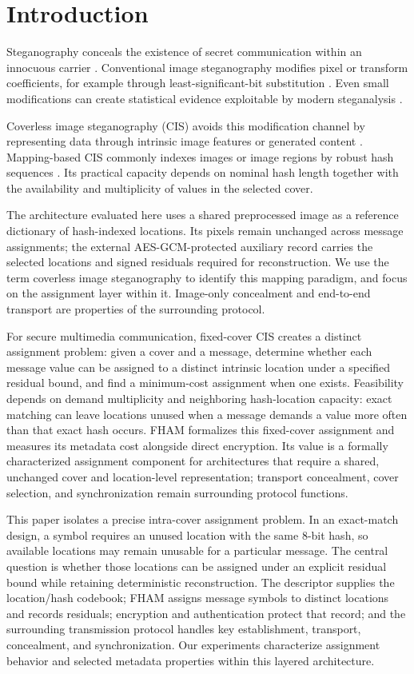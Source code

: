 \documentclass[preprint,12pt]{elsarticle}
\theoremstyle{plain}
\begin{document}
\section{Introduction}
Steganography conceals the existence of secret communication within an innocuous carrier \cite{johnson1998exploring}. Conventional image steganography modifies pixel or transform coefficients, for example through least-significant-bit substitution \cite{chan2004hiding}. Even small modifications can create statistical evidence exploitable by modern steganalysis \cite{fridrich2012rich,xu2016structural}.

Coverless image steganography (CIS) avoids this modification channel by representing data through intrinsic image features or generated content \cite{zhou2015coverless,qin2020gan,tan2024review}. Mapping-based CIS commonly indexes images or image regions by robust hash sequences \cite{zheng2018coverless}. Its practical capacity depends on nominal hash length together with the availability and multiplicity of values in the selected cover.

The architecture evaluated here uses a shared preprocessed image as a reference dictionary of hash-indexed locations. Its pixels remain unchanged across message assignments; the external AES-GCM-protected auxiliary record carries the selected locations and signed residuals required for reconstruction. We use the term coverless image steganography to identify this mapping paradigm, and focus on the assignment layer within it. Image-only concealment and end-to-end transport are properties of the surrounding protocol.

For secure multimedia communication, fixed-cover CIS creates a distinct assignment problem: given a cover and a message, determine whether each message value can be assigned to a distinct intrinsic location under a specified residual bound, and find a minimum-cost assignment when one exists. Feasibility depends on demand multiplicity and neighboring hash-location capacity: exact matching can leave locations unused when a message demands a value more often than that exact hash occurs. FHAM formalizes this fixed-cover assignment and measures its metadata cost alongside direct encryption. Its value is a formally characterized assignment component for architectures that require a shared, unchanged cover and location-level representation; transport concealment, cover selection, and synchronization remain surrounding protocol functions.

This paper isolates a precise intra-cover assignment problem. In an exact-match design, a symbol requires an unused location with the same 8-bit hash, so available locations may remain unusable for a particular message. The central question is whether those locations can be assigned under an explicit residual bound while retaining deterministic reconstruction. The descriptor supplies the location/hash codebook; FHAM assigns message symbols to distinct locations and records residuals; encryption and authentication protect that record; and the surrounding transmission protocol handles key establishment, transport, concealment, and synchronization. Our experiments characterize assignment behavior and selected metadata properties within this layered architecture.
\end{document}
